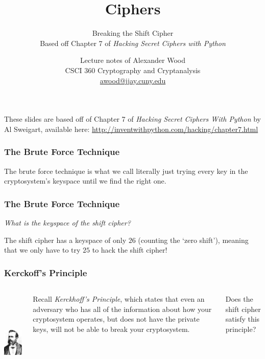 \documentclass{beamer}
\title[CSCI360]{Ciphers}
\subtitle{Breaking the Shift Cipher \\ Based off Chapter 7 of \emph{Hacking Secret Ciphers with Python} }
\author
{Lecture notes of Alexander Wood \\ CSCI 360 Cryptography and Cryptanalysis \\ \scriptsize \href{mailto:awood@jjay.cuny.edu}{awood@jjay.cuny.edu}}
\institute[JJay]{John Jay College of Criminal Justice}
\date{}
\newcommand{\<}{\langle}
\renewcommand{\>}{\rangle}
\begin{document}

\begin{frame}
  \titlepage
\end{frame}

\begin{frame}
These slides are based off of Chapter 7 of \emph{Hacking Secret Ciphers With Python} by Al Sweigart, available here: \url{http://inventwithpython.com/hacking/chapter7.html}
\end{frame}


\begin{frame}
\frametitle{The Brute Force Technique}

The brute force technique is what we call literally just trying every key in the cryptosystem's keyspace until we find the right one.
\end{frame}


\begin{frame}
\frametitle{The Brute Force Technique}

\emph{What is the keyspace of the shift cipher?}\newline

\pause

The shift cipher has a keyspace of only $26$ (counting the `zero shift'), meaning that we only have to try $25$ to hack the shift cipher!
\end{frame}


\begin{frame}
\frametitle{Kerckoff's Principle}

\begin{columns}
\centering
\includegraphics[height=5cm, width=3.5cm]{IMG/kerckhoffs.jpg}

Recall \emph{Kerckhoff's Principle}, which states that even an adversary who has all of the information about how your cryptosystem operates, but does not have the private keys, will not be able to break your cryptosystem. \newline

Does the shift cipher satisfy this principle?
\end{columns} 
\end{frame}
\end{document}
